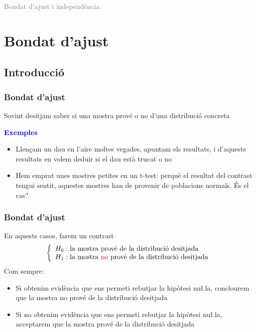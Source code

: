 \documentclass[12pt,t]{beamer}
\title[\red{Matemàtiques III}]{}
\author[]{}
\date{}
\newcommand{\blue}[1]{\textcolor{blue}{#1}}
\newcommand{\gray}[1]{\textcolor{gray}{#1}}
\renewcommand{\emph}[1]{{\color{red}#1}}
\theoremstyle{plain}
\theoremstyle{definition}
\begin{document}
\beamertemplatedotitem

\lstset{breaklines=true}
\lstset{basicstyle=\ttfamily}


\begin{frame}
\vfill
\begin{center}
\gray{\LARGE Bondat d'ajust i independència}
\end{center}
\vfill
\end{frame}




\section{Bondat d'ajust}
\subsection{Introducció}

\begin{frame}

\frametitle{Bondat d'ajust}

Sovint desitjam saber si una mostra prové o no d'una distribució concreta
\medskip

\blue{\textbf{Exemples}}
\begin{itemize}
\item Llençam un dau en l'aire moltes vegades, apuntam els resultats, i d'aquests resultats en volem deduir si el dau està trucat o no
\medskip


\item Hem emprat unes mostres petites en un t-test: perquè el resultat del contrast tengui sentit, aquestes mostres han de provenir de poblacions normals. És el cas?
\end{itemize}
\end{frame}


\begin{frame}

\frametitle{Bondat d'ajust}

En aquests casos, farem un contrast
$$
\left\{
\begin{array}{l}
H_0: \mbox{la mostra prové de la distribució desitjada}\\
H_1: \mbox{la mostra \emph{no} prové de la distribució desitjada}
\end{array}
\right.
$$
Com sempre:
\begin{itemize}
\item Si obtenim evidència que ens permeti rebutjar la hipòtesi nu\l.la, conclourem que la mostra no prové  
 de la distribució desitjada
 \medskip
 
\item Si no obtenim evidència que ens permeti rebutjar la hipòtesi nu\l.la, acceptarem que la mostra prové  
 de la distribució desitjada 
 \end{itemize}
\end{frame}
\end{document}
